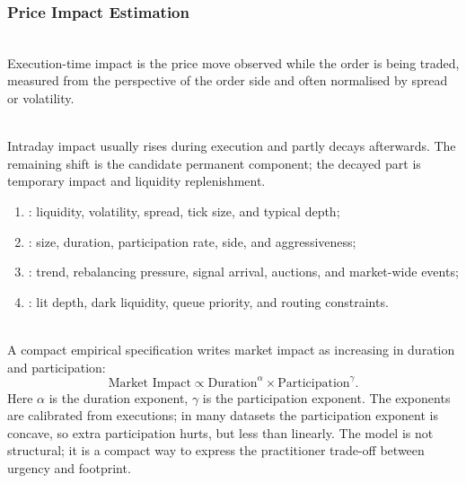 \subsubsection{Price Impact Estimation}

\begin{definition} \\
Execution-time impact is the price move observed while the order is being traded, measured from the perspective of the order side and often normalised by spread or volatility.
\end{definition}

\begin{empiricalfinding} \\
Intraday impact usually rises during execution and partly decays afterwards. The remaining shift is the candidate permanent component; the decayed part is temporary impact and liquidity replenishment.
\end{empiricalfinding}

\begin{taxonomy} 
\begin{enumerate}[label=\roman*.]
\setlength{\itemsep}{0pt}
\item {}: liquidity, volatility, spread, tick size, and typical depth;
\item {}: size, duration, participation rate, side, and aggressiveness;
\item {}: trend, rebalancing pressure, signal arrival, auctions, and market-wide events;
\item {}: lit depth, dark liquidity, queue priority, and routing constraints.
\end{enumerate}
\end{taxonomy}

\begin{model} \\
A compact empirical specification writes market impact as increasing in duration and participation:
\begin{equation*}
\text{Market Impact} \propto \text{Duration}^{\alpha}\times \text{Participation}^{\gamma}.
\end{equation*}
Here $\alpha$ is the duration exponent, $\gamma$ is the participation exponent. The exponents are calibrated from executions; in many datasets the participation exponent is concave, so extra participation hurts, but less than linearly. The model is not structural; it is a compact way to express the practitioner trade-off between urgency and footprint.
\end{model}

